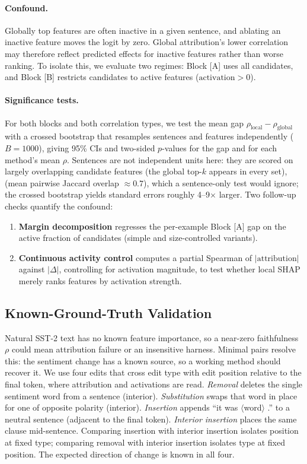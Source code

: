 \paragraph{Confound.}\label{para:confound} Globally top features are often inactive in a given sentence, and ablating an inactive feature moves the logit by zero. Global attribution’s lower correlation may therefore reflect predicted effects for inactive features rather than worse ranking. To isolate this, we evaluate two regimes: Block [A] uses all candidates, and Block [B] restricts candidates to active features ($\text{activation} > 0$).

\paragraph{Significance tests.} For both blocks and both correlation types, we test the mean gap $\rho_\text{local}-\rho_\text{global}$ with a crossed bootstrap that resamples sentences and features independently ($B=1000$), giving 95\% CIs and two-sided $p$-values for the gap and for each method's mean $\rho$. Sentences are not independent units here: they are scored on largely overlapping candidate features (the global top-$k$ appears in every set), (mean pairwise Jaccard overlap $\approx0.7$), which a sentence-only test would ignore; the crossed bootstrap yields standard errors roughly 4--9$\times$ larger. Two follow-up checks quantify the confound:
\begin{enumerate}
\item \textbf{Margin decomposition} regresses the per-example Block [A] gap on the active fraction of candidates (simple and size-controlled variants).
\item \textbf{Continuous activity control} computes a partial Spearman of $|\text{attribution}|$ against $|\Delta|$, controlling for activation magnitude, to test whether local SHAP merely ranks features by activation strength.
\end{enumerate}

\subsection{Known-Ground-Truth Validation}
Natural SST-2 text has no known feature importance, so a near-zero faithfulness $\rho$ could mean attribution failure or an insensitive harness. Minimal pairs resolve this: the sentiment change has a known source, so a working method should recover it. We use four edits that cross edit type with edit position relative to the final token, where attribution and activations are read. \emph{Removal} deletes the single sentiment word from a sentence (interior). \emph{Substitution} swaps that word in place for one of opposite polarity (interior). \emph{Insertion} appends ``it was $\langle$word$\rangle$ .'' to a neutral sentence (adjacent to the final token). \emph{Interior insertion} places the same clause mid-sentence. Comparing insertion with interior insertion isolates position at fixed type; comparing removal with interior insertion isolates type at fixed position. The expected direction of change is known in all four.

